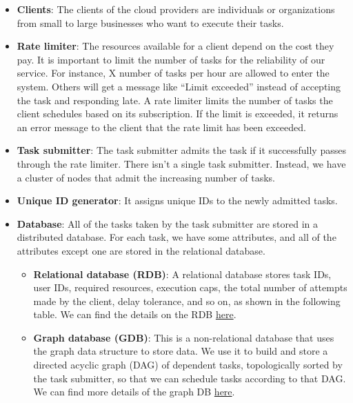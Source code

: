 \begin{itemize}
\item
\protect{}\label{vZoy7Xk0kYWalw8Jan4bU}
\textbf{Clients}: The clients of the cloud providers are individuals or organizations from small to large businesses who want to execute their tasks.
\item
\protect{}\label{2e-X1FLZmNZBmzkLhQ9f-}
\textbf{Rate limiter}: The resources available for a client depend on the cost they pay. It is important to limit the number of tasks for the reliability of our service. For instance, X number of tasks per hour are allowed to enter the system. Others will get a message like ``Limit exceeded'' instead of accepting the task and responding late. A rate limiter limits the number of tasks the client schedules based on its subscription. If the limit is exceeded, it returns an error message to the client that the rate limit has been exceeded.
\item
\protect{}\label{-yPu2vI-DQFlC9CqV7Bmv}
\textbf{Task submitter}: The task submitter admits the task if it successfully passes through the rate limiter. There isn't a single task submitter. Instead, we have a cluster of nodes that admit the increasing number of tasks.
\item
\protect{}\label{DhAa4YXH5qno0dLErmJZY}
\textbf{Unique ID generator}: It assigns unique IDs to the newly admitted tasks.
\item
\protect{}\label{44a0L8QmL3yFUS9hx43ry}
\textbf{Database}: All of the tasks taken by the task submitter are stored in a distributed database. For each task, we have some attributes, and all of the attributes except one are stored in the relational database.

\begin{itemize}
\item
\textbf{Relational database (RDB)}: A relational database stores task IDs, user IDs, required resources, execution caps, the total number of attempts made by the client, delay tolerance, and so on, as shown in the following table. We can find the details on the RDB \href{https://www.educative.io/courses/grokking-the-system-design-interview/types-of-databases}{here}.
\item
\textbf{Graph database (GDB)}: This is a non-relational database that uses the graph data structure to store data. We use it to build and store a directed acyclic graph (DAG) of dependent tasks, topologically sorted by the task submitter, so that we can schedule tasks according to that DAG. We can find more details of the graph DB \href{https://www.educative.io/courses/grokking-the-system-design-interview/types-of-databases}{here}.
\end{itemize}
\end{itemize}

